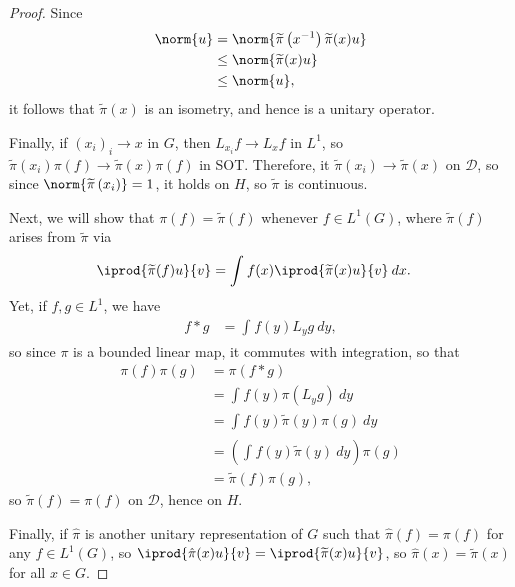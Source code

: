 \documentclass[12pt]{mypackage}
\begin{document}
\begin{proof}
  Since
  \begin{align*}
    \norm{u} &= \norm{ \widetilde{\pi}\left( x^{-1} \right)\widetilde{\pi}(x)u }\\
             &\leq \norm{ \widetilde{\pi}(x)u }\\
             &\leq \norm{u},
  \end{align*}
  it follows that $\widetilde{\pi}(x)$ is an isometry, and hence is a unitary operator.

  Finally, if $\left( x_{i} \right)_i\rightarrow x$ in $G$, then $L_{x_i}f\rightarrow L_xf$ in $L^1$, so $ \widetilde{\pi}\left( x_i \right)\pi(f) \rightarrow \widetilde{\pi}(x)\pi(f) $ in SOT. Therefore, it $\widetilde{\pi}\left( x_i \right)\rightarrow \widetilde{\pi}(x)$ on $\mathcal{D}$, so since $\norm{\widetilde{\pi}\left( x_i \right)} = 1$, it holds on $H$, so $\widetilde{\pi}$ is continuous.

  Next, we will show that $\pi(f) = \widetilde{\pi}(f)$ whenever $f\in L^1\left( G \right)$, where $ \widetilde{\pi}(f) $ arises from $\widetilde{\pi}$ via
  \begin{align*}
    \iprod{\widetilde{\pi}(f)u}{v} &= \int_{}^{} f(x) \iprod{\widetilde{\pi}(x)u}{v}\:dx.
  \end{align*}
  Yet, if $f,g\in L^1$, we have
  \begin{align*}
    f\ast g &= \int_{}^{} f(y)L_yg\:dy,
  \end{align*}
  so since $\pi$ is a bounded linear map, it commutes with integration, so that
  \begin{align*}
    \pi(f)\pi(g) &= \pi\left( f\ast g \right)\\
                 &= \int_{}^{} f(y)\pi\left( L_yg \right)\:dy\\
                 &= \int_{}^{} f(y)\widetilde{\pi}(y)\pi(g)\:dy\\
                 &= \left( \int_{}^{} f(y)\widetilde{\pi}(y)\:dy \right)\pi(g)\\
                 &= \widetilde{\pi}(f)\pi(g),
  \end{align*}
  so $\widetilde{\pi}(f) = \pi(f)$ on $\mathcal{D}$, hence on $H$.

  Finally, if $ \hat{\pi} $ is another unitary representation of $G$ such that $\hat{\pi}(f) = \pi(f)$ for any $f\in L^1(G)$, so $ \iprod{\hat{\pi}(x)u}{v} = \iprod{\widetilde{\pi}(x)u}{v} $, so $\hat{\pi}(x) = \widetilde{\pi}(x)$ for all $x\in G$.
\end{proof}


\nocite{folland_abstract_harmonic_analysis,kazhdan_property_t,kerr_and_li}
\printbibliography
\end{document}
